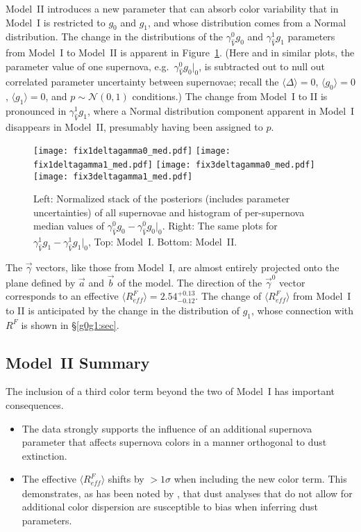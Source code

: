 \documentclass[trackchanges]{aastex62}   	%
\begin{document}
Model~II introduces a new parameter  that can absorb color variability
that in Model~I is restricted to $g_0$ and $g_1$, and whose distribution comes from a Normal distribution.
The change in the distributions of the $\gamma^0_{\hat{V}} g_0$ and $\gamma^1_{\hat{V}}g_1$ parameters from
 Model~I to Model~II
is apparent in Figure~\ref{kcomp:fig}.  (Here and in similar plots, the parameter value of one supernova,
e.g.\ $\gamma^0_{\hat{V}} g_0|_0$, is subtracted
out to null out correlated
parameter uncertainty between supernovae; recall the $\langle \Delta \rangle=0$, $\langle g_0 \rangle=0$, $\langle g_1 \rangle=0$,
and $p  \sim \mathcal{N}(0,1)$ conditions.) The  change from Model~I to II is pronounced in  $\gamma^1_{\hat{V}}g_1$,
where  a Normal distribution component apparent in Model~I disappears in Model~II, presumably having been  assigned to $p$.


\begin{figure}[htbp] %
   \centering
   \texttt{[image: fix1deltagamma0\_med.pdf]} 
   \texttt{[image: fix1deltagamma1\_med.pdf]} 
   \texttt{[image: fix3deltagamma0\_med.pdf]} 
   \texttt{[image: fix3deltagamma1\_med.pdf]} 
   \caption{
   Left:
   Normalized stack of the posteriors (includes parameter uncertainties) of all supernovae  and histogram 
      of  per-supernova 
median values of $\gamma^0_{\hat{V}} g_0-\gamma^0_{\hat{V}} g_0|_0$.  Right:  The same plots for $\gamma^1_{\hat{V}} g_1-\gamma^1_{\hat{V}} g_1|_0$,
Top: Model~I. Bottom: Model~II.
    \label{kcomp:fig}}
\end{figure}

The $\vec{\gamma}$ vectors, like those from Model~I, are almost entirely projected
onto the plane defined by
$\vec{a}$ and $\vec{b}$ of the  model.
The direction of the  $\vec{\gamma}^0$ vector corresponds to an effective
$\langle R^F_{\mathit{eff}}\rangle = 2.54^{+0.13}_{-0.12}$.
The change of $\langle R^F_{\mathit{eff}}\rangle$ from Model~I to II is anticipated by the change in the distribution of $g_1$,
whose connection with $R^F$ is shown in \S\ref{g0g1:sec}.


\subsection{Model~II Summary}
The inclusion of a third color term beyond the two of Model~I has important consequences.

\begin{itemize}
\item The data strongly supports the influence of an additional supernova parameter that affects supernova colors in a manner orthogonal to
 dust extinction.
\item The effective $\langle R^F_{\mathit{eff}}\rangle$ shifts by $>1 \sigma$ when including the new color term.  This demonstrates,
as has been noted by \citet{2009ApJ...704.1036F,2009ApJS..185...32K}, that dust analyses
that do not allow for additional color dispersion are susceptible to bias when inferring dust parameters.
\end{itemize}
\end{document}
